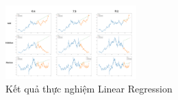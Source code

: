 \hfill
\begin{figure}[H]
\centerline{\includegraphics[width=0.45\textwidth]{img/Linear_result.png}}
\caption{Kết quả thực nghiệm Linear Regression}
\label{fig}
\end{figure}